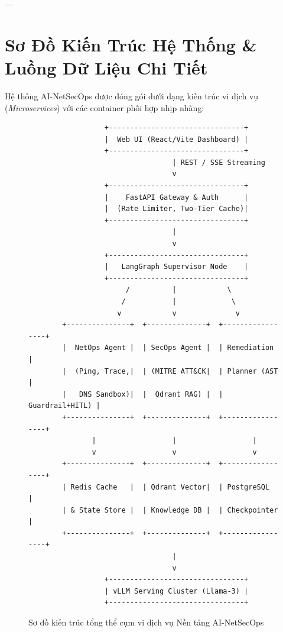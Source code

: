 ---

\section{Sơ Đồ Kiến Trúc Hệ Thống \& Luồng Dữ Liệu Chi Tiết}
\label{sec:ch14-architecture-diagram}

Hệ thống AI-NetSecOps được đóng gói dưới dạng kiến trúc vi dịch vụ (\textit{Microservices}) với các container phối hợp nhịp nhàng:

\begin{figure}[htbp]
\centering
\small
\begin{verbatim}
                  +--------------------------------+
                  |  Web UI (React/Vite Dashboard) |
                  +--------------------------------+
                                  | REST / SSE Streaming
                                  v
                  +--------------------------------+
                  |    FastAPI Gateway & Auth      |
                  |  (Rate Limiter, Two-Tier Cache)|
                  +--------------------------------+
                                  |
                                  v
                  +--------------------------------+
                  |   LangGraph Supervisor Node    |
                  +--------------------------------+
                       /          |            \
                      /           |             \
                     v            v              v
        +---------------+  +--------------+  +-----------------+
        |  NetOps Agent |  | SecOps Agent |  | Remediation     |
        |  (Ping, Trace,|  | (MITRE ATT&CK|  | Planner (AST    |
        |   DNS Sandbox)|  |  Qdrant RAG) |  | Guardrail+HITL) |
        +---------------+  +--------------+  +-----------------+
               |                  |                  |
               v                  v                  v
        +---------------+  +--------------+  +-----------------+
        | Redis Cache   |  | Qdrant Vector|  | PostgreSQL      |
        | & State Store |  | Knowledge DB |  | Checkpointer    |
        +---------------+  +--------------+  +-----------------+
                                  |
                                  v
                  +--------------------------------+
                  | vLLM Serving Cluster (Llama-3) |
                  +--------------------------------+
\end{verbatim}
\caption{Sơ đồ kiến trúc tổng thể cụm vi dịch vụ Nền tảng AI-NetSecOps}
\label{fig:capstone-architecture}
\end{figure}

